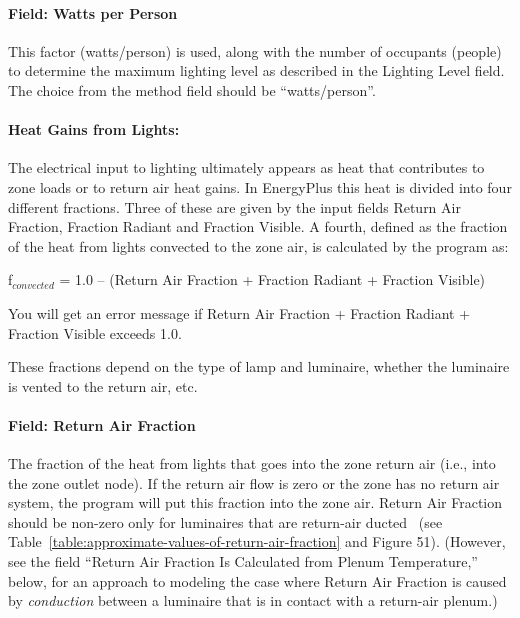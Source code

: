 \paragraph{Field: Watts per Person}\label{field-watts-per-person}

This factor (watts/person) is used, along with the number of occupants (people) to determine the maximum lighting level as described in the Lighting Level field. The choice from the method field should be ``watts/person''.

\paragraph{Heat Gains from Lights:}\label{heat-gains-from-lights}

The electrical input to lighting ultimately appears as heat that contributes to zone loads or to return air heat gains. In EnergyPlus this heat is divided into four different fractions. Three of these are given by the input fields Return Air Fraction, Fraction Radiant and Fraction Visible. A fourth, defined as the fraction of the heat from lights convected to the zone air, is calculated by the program as:

f\(_{convected}\) = 1.0 -- (Return Air Fraction + Fraction Radiant + Fraction Visible)

You will get an error message if Return Air Fraction + Fraction Radiant + Fraction Visible exceeds 1.0.

These fractions depend on the type of lamp and luminaire, whether the luminaire is vented to the return air, etc.

\paragraph{Field: Return Air Fraction}\label{field-return-air-fraction}

The fraction of the heat from lights that goes into the zone return air (i.e., into the zone outlet node). If the return air flow is zero or the zone has no return air system, the program will put this fraction into the zone air. Return Air Fraction should be non-zero only for luminaires that are return-air ducted~ (see Table~\ref{table:approximate-values-of-return-air-fraction} and Figure 51). (However, see the field ``Return Air Fraction Is Calculated from Plenum Temperature,'' below, for an approach to modeling the case where Return Air Fraction is caused by \emph{conduction} between a luminaire that is in contact with a return-air plenum.)

